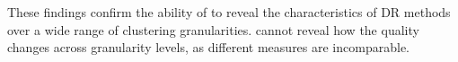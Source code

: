 These findings confirm the ability of \ltc to reveal the characteristics of DR methods over a wide range of clustering granularities.
 cannot reveal how the quality changes across granularity levels, as different measures are incomparable.




















